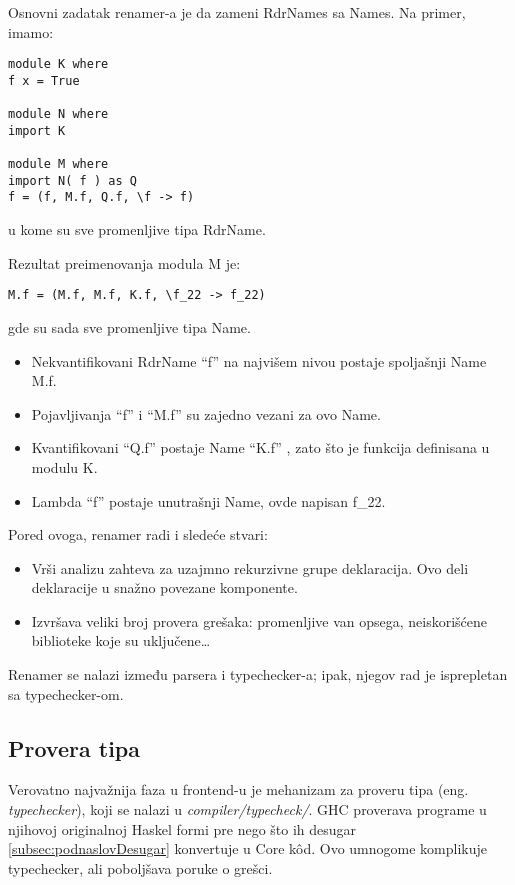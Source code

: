Osnovni zadatak renamer-a je da zameni RdrNames sa Names. Na primer, imamo:

\begin{verbatim}
module K where
f x = True

module N where
import K

module M where
import N( f ) as Q
f = (f, M.f, Q.f, \f -> f)
\end{verbatim}
u kome su sve promenljive tipa RdrName. 

Rezultat preimenovanja modula M je:
\begin{verbatim}
M.f = (M.f, M.f, K.f, \f_22 -> f_22)
\end{verbatim} 
gde su sada sve promenljive tipa Name.
\begin{itemize}
	\item Nekvantifikovani RdrName “f” na najvišem nivou postaje spoljašnji Name M.f.
	\item Pojavljivanja “f” i  “M.f” su zajedno vezani za ovo Name.
	\item Kvantifikovani “Q.f” postaje Name “K.f” , zato što je funkcija definisana u modulu K.
	\item Lambda “f” postaje unutrašnji Name, ovde napisan f\_22.
\end{itemize}

Pored ovoga, renamer radi i sledeće stvari:
\begin{itemize}
	\item Vrši analizu zahteva za uzajmno rekurzivne grupe deklaracija. Ovo deli deklaracije u snažno povezane komponente.
	\item Izvršava veliki broj provera grešaka: promenljive van opsega, neiskorišćene biblioteke koje su uključene\ldots	
\end{itemize}

Renamer se nalazi između parsera i typechecker-a; ipak, njegov rad je isprepletan sa typechecker-om.

\subsection{Provera tipa}
\label{subsec:podnaslovTypecheck}

Verovatno najvažnija faza u frontend-u je mehanizam za proveru tipa (eng. \emph{typechecker}), koji se nalazi u \textit{compiler/typecheck/}. GHC proverava programe u njihovoj originalnoj Haskel formi pre nego što ih desugar \ref{subsec:podnaslovDesugar} konvertuje u Core k\^{o}d. Ovo umnogome komplikuje typechecker, ali poboljšava poruke o grešci.

